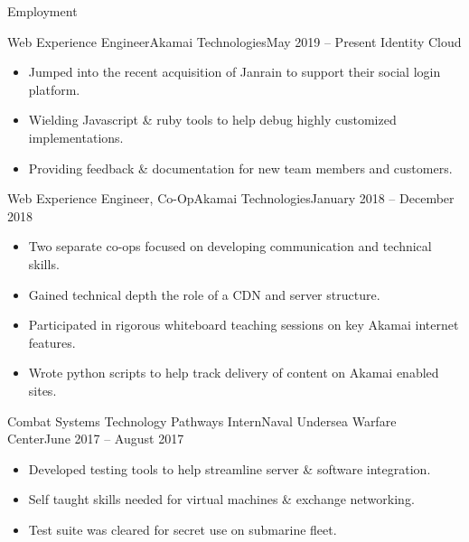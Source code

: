 \documentclass[]{mcdowellcv}
\begin{document}
	\makeheader
	
	\begin{cvsection}{Employment}
		\begin{cvsubsection}{Web Experience Engineer}{Akamai Technologies}{May 2019 -- Present}
			Identity Cloud			
			\begin{itemize}
				\item Jumped into the recent acquisition of Janrain to support their social login platform.
				\item Wielding Javascript \& ruby tools to help debug highly customized implementations.
				\item Providing feedback \& documentation for new team members and customers.
			\end{itemize}
		\end{cvsubsection}
		
		\begin{cvsubsection}{Web Experience Engineer, Co-Op}{Akamai Technologies}{January 2018 -- December 2018}	
			\begin{itemize}
				\item Two separate co-ops focused on developing communication and technical skills.
				\item Gained technical depth the role of a CDN and server structure.
				\item Participated in rigorous whiteboard teaching sessions on key Akamai internet features.
				\item Wrote python scripts to help track delivery of content on Akamai enabled sites.
			\end{itemize}
		\end{cvsubsection}
		
		\begin{cvsubsection}{Combat Systems Technology Pathways Intern}{Naval Undersea Warfare Center}{June 2017 -- August 2017}		
			\begin{itemize}
				\item Developed testing tools to help streamline server \& software integration.
				\item Self taught skills needed for virtual machines \& exchange networking.
				\item Test suite was cleared for secret use on submarine fleet.
			\end{itemize}
		\end{cvsubsection}
		
	\end{cvsection}
	
\end{document}
